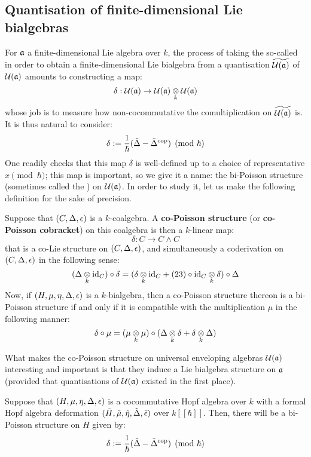     \subsection{Quantisation of finite-dimensional Lie bialgebras}
        For $\mathfrak{a}$ a finite-dimensional Lie algebra over $k$, the process of taking the so-called  in order to obtain a finite-dimensional Lie bialgebra from a quantisation $\widetilde{\mathcal{U}(\mathfrak{a})}$ of $\mathcal{U}(\mathfrak{a})$ amounts to constructing a  map:
            $$\delta: \calU(\a) \to \calU(\a) \tensor_k \calU(\a)$$
        whose job is to measure how non-cocommutative the comultiplication on $\widetilde{\mathcal{U}(\mathfrak{a})}$ is. It is thus natural to consider:
            $$\delta := \frac1\hbar(\tilde{\Delta} - \tilde{\Delta}^{\mathrm{cop}}) \pmod{\hbar}$$
        One readily checks that this map $\delta$ is well-defined up to a choice of representative $x \pmod{\hbar}$; this map is important, so we give it a name: the bi-Poisson structure (sometimes called the ) on $\mathcal{U}(\mathfrak{a})$. In order to study it, let us make the following definition for the sake of precision.
        \begin{definition} \label{def: co/bi_poisson_structures}
            Suppose that $(C, \Delta, \epsilon)$ is a $k$-coalgebra. A \textbf{co-Poisson structure} (or \textbf{co-Poisson cobracket}) on this coalgebra is then a $k$-linear map:
                $$\delta: C \to C \wedge C$$
            that is a co-Lie structure on $(C, \Delta, \epsilon)$, and simultaneously a coderivation on $(C, \Delta, \epsilon)$ in the following sense:
                $$(\Delta \tensor_k \id_C) \circ \delta = (\delta \tensor_k \id_C + (23) \circ \id_C \tensor_k \delta) \circ \Delta$$
            Now, if $(H, \mu, \eta, \Delta, \epsilon)$ is a $k$-bialgebra, then a co-Poisson structure thereon is a bi-Poisson structure if and only if it is compatible with the multiplication $\mu$ in the following manner:
                $$\delta \circ \mu = (\mu \tensor_k \mu) \circ (\Delta \tensor_k \delta + \delta \tensor_k \Delta)$$
        \end{definition}
        What makes the co-Poisson structure on universal enveloping algebras $\mathcal{U}(\mathfrak{a})$ interesting and important is that they induce a Lie bialgebra structure on $\mathfrak{a}$ (provided that quantisations of $\mathcal{U}(\mathfrak{a})$ existed in the first place). 
        \begin{lemma} \label{lemma: bi_poisson_structures_from_hopf_algebra_deformations}
            Suppose that $(H, \mu, \eta, \Delta, \epsilon)$ is a cocommutative Hopf algebra over $k$ with a formal Hopf algebra deformation $(\tilde{H}, \tilde{\mu}, \tilde{\eta}, \tilde{\Delta}, \tilde{\epsilon})$ over $k[\![\hbar]\!]$. Then, there will be a bi-Poisson structure on $H$ given by:
                $$\delta := \frac{1}{\hbar}(\tilde{\Delta} - \tilde{\Delta}^{\mathrm{cop}}) \pmod{\hbar}$$
        \end{lemma}
